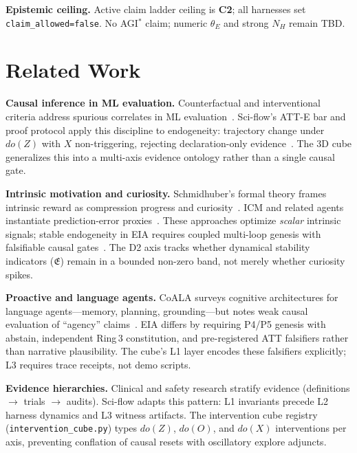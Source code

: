 \documentclass[11pt,a4paper]{article}
\theoremstyle{definition}
\begin{document}
\textbf{Epistemic ceiling.} Active claim ladder ceiling is \textbf{C2}; all harnesses set \texttt{claim\_allowed=false}. No AGI$^{*}$ claim; numeric $\theta_E$ and strong $N_H$ remain TBD.

\section{Related Work}\label{sec:related}

\textbf{Causal inference in ML evaluation.} Counterfactual and interventional criteria address spurious correlates in ML evaluation~\cite{veitch2021counterfactual,pearl2009causality}. Sci-flow's ATT-E bar and proof protocol apply this discipline to endogeneity: trajectory change under $do(Z)$ with $X$ non-triggering, rejecting declaration-only evidence~\cite{kuznetsov2026causal,kuznetsov2026proof}. The 3D cube generalizes this into a multi-axis evidence ontology rather than a single causal gate.

\textbf{Intrinsic motivation and curiosity.} Schmidhuber's formal theory frames intrinsic reward as compression progress and curiosity~\cite{schmidhuber2010curiosity}. ICM and related agents instantiate prediction-error proxies~\cite{pathak2017curiosity}. These approaches optimize \emph{scalar} intrinsic signals; stable endogeneity in EIA requires coupled multi-loop genesis with falsifiable causal gates~\cite{kuznetsov2026stable}. The D2 axis tracks whether dynamical stability indicators ($\mathfrak{E}$) remain in a bounded non-zero band, not merely whether curiosity spikes.

\textbf{Proactive and language agents.} CoALA surveys cognitive architectures for language agents---memory, planning, grounding---but notes weak causal evaluation of ``agency'' claims~\cite{sumers2024cala}. EIA differs by requiring P4/P5 genesis with abstain, independent Ring\,3 constitution, and pre-registered ATT falsifiers rather than narrative plausibility. The cube's L1 layer encodes these falsifiers explicitly; L3 requires trace receipts, not demo scripts.

\textbf{Evidence hierarchies.} Clinical and safety research stratify evidence (definitions $\to$ trials $\to$ audits). Sci-flow adapts this pattern: L1 invariants precede L2 harness dynamics and L3 witness artifacts. The intervention cube registry (\texttt{intervention\_cube.py}) types $do(Z)$, $do(O)$, and $do(X)$ interventions per axis, preventing conflation of causal resets with oscillatory explore adjuncts.
\end{document}
